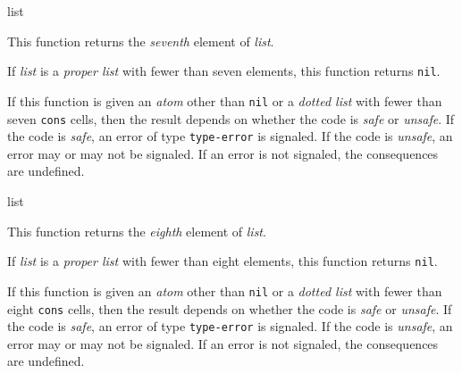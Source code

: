  {list}

This function returns the \emph{seventh} element of \textit{list}.

If \textit{list} is a \emph{proper list} with fewer than seven
elements, this function returns \texttt{nil}.

If this function is given an \emph{atom} other than \texttt{nil} or a
\emph{dotted list} with fewer than seven \texttt{cons} cells, then the
result depends on whether the code is \emph{safe} or \emph{unsafe}.
If the code is \emph{safe}, an error of type \texttt{type-error} is
signaled.  If the code is \emph{unsafe}, an error may or may not be
signaled.  If an error is not signaled, the consequences are
undefined.

 {list}

This function returns the \emph{eighth} element of \textit{list}.

If \textit{list} is a \emph{proper list} with fewer than eight
elements, this function returns \texttt{nil}.

If this function is given an \emph{atom} other than \texttt{nil} or a
\emph{dotted list} with fewer than eight \texttt{cons} cells, then the
result depends on whether the code is \emph{safe} or \emph{unsafe}.
If the code is \emph{safe}, an error of type \texttt{type-error} is
signaled.  If the code is \emph{unsafe}, an error may or may not be
signaled.  If an error is not signaled, the consequences are
undefined.
